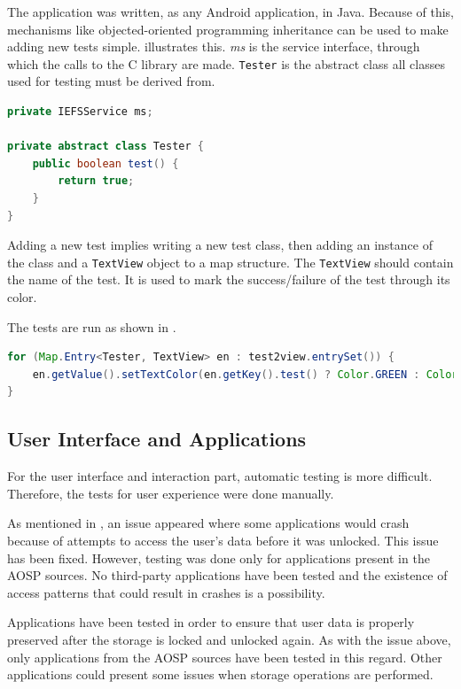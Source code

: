 The application was written, as any Android application, in Java. Because of this, mechanisms like objected-oriented programming inheritance can be used to make adding new tests simple.  illustrates this. \textit{ms} is the service interface, through which the calls to the C library are made. \texttt{Tester} is the abstract class all classes used for testing must be derived from.

\begin{lstlisting}[language=Java, caption=Tester class, label=lst:tester-eval]
private IEFSService ms;

private abstract class Tester {
    public boolean test() {
        return true;
    }
}
\end{lstlisting}

Adding a new test implies writing a new test class, then adding an instance of the class and a \texttt{TextView} object to a map structure. The \texttt{TextView} should contain the name of the test. It is used to mark the success/failure of the test through its color.

The tests are run as shown in .

\begin{lstlisting}[language=Java, numbers=none, caption=EFS Service tests, label=lst:run-eval]
for (Map.Entry<Tester, TextView> en : test2view.entrySet()) {
    en.getValue().setTextColor(en.getKey().test() ? Color.GREEN : Color.RED);
}
\end{lstlisting}

\subsection{User Interface and Applications}
\label{sub-sec:interf-apps-eval}

For the user interface and interaction part, automatic testing is more difficult. Therefore, the tests for user experience were done manually.

As mentioned in , an issue appeared where some applications would crash because of attempts to access the user's data before it was unlocked. This issue has been fixed. However, testing was done only for applications present in the AOSP sources. No third-party applications have been tested and the existence of access patterns that could result in crashes is a possibility.

Applications have been tested in order to ensure that user data is properly preserved after the storage is locked and unlocked again. As with the issue above, only applications from the AOSP sources have been tested in this regard. Other applications could present some issues when storage operations are performed.


